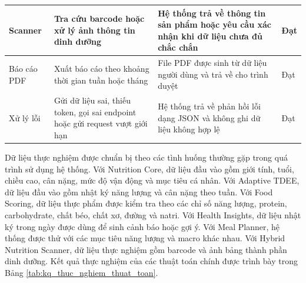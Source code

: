 \documentclass[12pt, a4paper]{report}
\begin{document}
\begin{longtable}{|>{\raggedright\arraybackslash}p{3cm}|>{\raggedright\arraybackslash}p{3cm}|>{\raggedright\arraybackslash}p{4cm}|>{\raggedright\arraybackslash}p{5cm}|}
\hline
Scanner & Tra cứu barcode hoặc xử lý ảnh thông tin dinh dưỡng & Hệ thống trả về thông tin sản phẩm hoặc yêu cầu xác nhận khi dữ liệu chưa đủ chắc chắn & Đạt \\
\hline
Báo cáo PDF & Xuất báo cáo theo khoảng thời gian tuần hoặc tháng & File PDF được sinh từ dữ liệu người dùng và trả về cho trình duyệt & Đạt \\
\hline
Xử lý lỗi & Gửi dữ liệu sai, thiếu token, gọi sai endpoint hoặc gửi request vượt giới hạn & Hệ thống trả về phản hồi lỗi dạng JSON và không ghi dữ liệu không hợp lệ & Đạt \\
\hline
\end{longtable}

Dữ liệu thực nghiệm được chuẩn bị theo các tình huống thường gặp trong quá trình sử dụng hệ thống. Với Nutrition Core, dữ liệu đầu vào gồm giới tính, tuổi, chiều cao, cân nặng, mức độ vận động và mục tiêu cá nhân. Với Adaptive TDEE, dữ liệu đầu vào gồm nhật ký năng lượng và cân nặng theo tuần. Với Food Scoring, dữ liệu thực phẩm được kiểm tra theo các chỉ số năng lượng, protein, carbohydrate, chất béo, chất xơ, đường và natri. Với Health Insights, dữ liệu nhật ký trong ngày được dùng để sinh cảnh báo hoặc gợi ý. Với Meal Planner, hệ thống được thử với các mục tiêu năng lượng và macro khác nhau. Với Hybrid Nutrition Scanner, dữ liệu thực nghiệm gồm barcode và ảnh bảng thành phần dinh dưỡng. Kết quả thực nghiệm của các thuật toán chính được trình bày trong Bảng \ref{tab:kq_thuc_nghiem_thuat_toan}.
\end{document}
